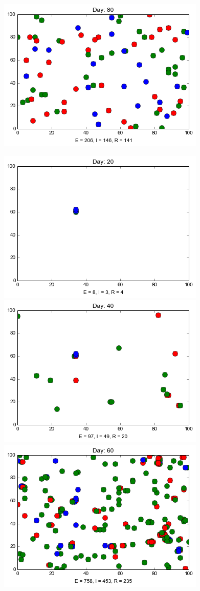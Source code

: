 \begin{minipage}{\linewidth}
\includegraphics[scale=0.28]{images/2t80.png} 


\medskip
\includegraphics[scale=0.28]{images/4t20.png} \quad
\includegraphics[scale=0.28]{images/4t40.png} \quad
\includegraphics[scale=0.28]{images/4t60.png} \quad

\end{minipage}
